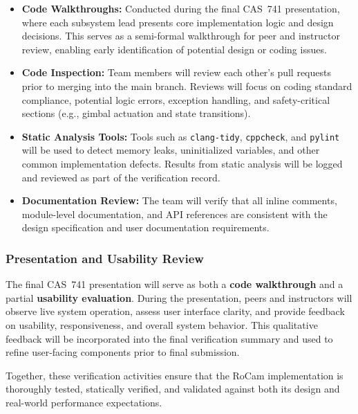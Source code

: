 \documentclass[12pt, titlepage]{article}
\begin{document}
\begin{itemize}
  \item \textbf{Code Walkthroughs:}
        Conducted during the final CAS~741 presentation, where each
        subsystem lead presents core implementation logic and design decisions.
        This serves as a semi-formal walkthrough for peer and instructor
        review, enabling early identification of potential design or coding issues.

  \item \textbf{Code Inspection:}
        Team members will review each other’s pull requests prior to
        merging into the main branch.
        Reviews will focus on coding standard compliance, potential
        logic errors, exception handling, and safety-critical sections
        (e.g., gimbal actuation and state transitions).

  \item \textbf{Static Analysis Tools:}
        Tools such as \texttt{clang-tidy}, \texttt{cppcheck}, and
        \texttt{pylint} will be used to detect memory leaks, uninitialized variables,
        and other common implementation defects.
        Results from static analysis will be logged and reviewed
        as part of the verification record.

  \item \textbf{Documentation Review:}
        The team will verify that all inline comments, module-level
        documentation, and API references are consistent with the design
        specification and user documentation requirements.
\end{itemize}

\subsubsection*{Presentation and Usability Review}
The final CAS~741 presentation will serve as both a
\textbf{code walkthrough} and a partial \textbf{usability evaluation}.
During the presentation, peers and instructors will observe live
system operation, assess user interface clarity, and provide
feedback on usability, responsiveness, and overall system behavior.
This qualitative feedback will be incorporated into the final
verification summary and used to refine user-facing components
prior to final submission.

\noindent
Together, these verification activities ensure that the RoCam
implementation is thoroughly tested, statically verified, and
validated against both its design and real-world performance expectations.
\end{document}
